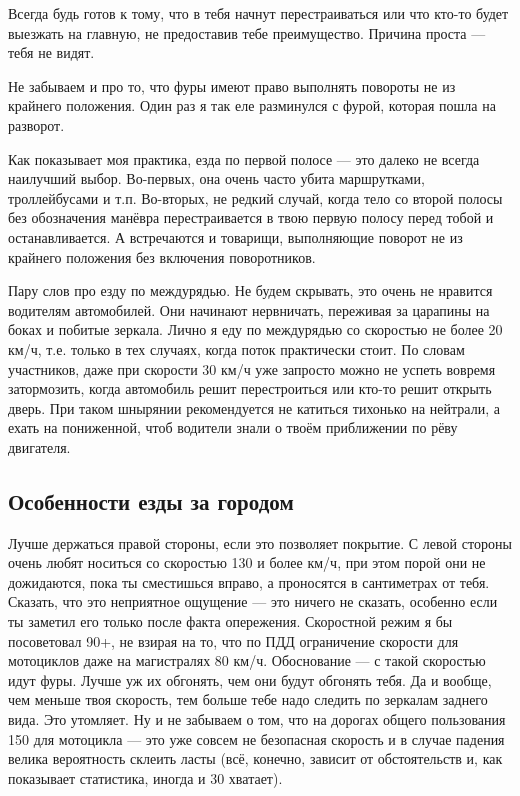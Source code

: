 \documentclass[12pt,a4paper]{article}
\begin{document}
Всегда будь готов к тому, что в тебя начнут перестраиваться или
что кто-то будет выезжать на главную, не предоставив тебе
преимущество. Причина проста --- тебя не видят.

Не забываем и про то, что фуры имеют право
выполнять повороты не из крайнего положения. Один раз я так еле
разминулся с фурой, которая пошла на разворот.

Как показывает моя практика, езда по первой полосе --- это далеко
не всегда наилучший выбор. Во-первых, она очень часто убита маршрутками,
троллейбусами и т.п. Во-вторых, не редкий случай, когда тело со второй
полосы без обозначения манёвра перестраивается в твою первую полосу
перед тобой и останавливается. А встречаются и товарищи, выполняющие
поворот не из крайнего положения без включения поворотников.

Пару слов про езду по междурядью. Не будем скрывать, это очень не
нравится водителям автомобилей. Они начинают нервничать, переживая
за царапины на боках и побитые зеркала. Лично я еду по междурядью со
скоростью не более 20 км/ч, т.е. только в тех случаях, когда поток
практически стоит. По словам участников, даже при скорости 30 км/ч
уже запросто можно не успеть вовремя затормозить, когда автомобиль
решит перестроиться или кто-то решит открыть дверь. При таком
шнырянии рекомендуется не катиться тихонько на нейтрали, а ехать
на пониженной, чтоб водители знали о твоём приближении по рёву
двигателя.

\subsection{Особенности езды за городом}

Лучше держаться правой стороны, если это позволяет покрытие.
С левой стороны очень любят носиться со скоростью 130 и более км/ч,
при этом порой они не дожидаются, пока ты сместишься вправо, а
проносятся в сантиметрах от тебя. Сказать, что это неприятное ощущение ---
это ничего не сказать, особенно если ты заметил его только после факта
опережения. Скоростной режим я бы посоветовал 90+, не взирая на то,
что по ПДД ограничение скорости для мотоциклов даже на магистралях
80 км/ч. Обоснование --- с такой скоростью идут фуры. Лучше уж их обгонять,
чем они будут обгонять тебя. Да и вообще, чем меньше твоя скорость,
тем больше тебе надо следить по зеркалам заднего вида. Это утомляет.
Ну и не забываем о том, что на дорогах общего пользования 150 для
мотоцикла --- это уже совсем не безопасная скорость и в случае
падения велика вероятность склеить ласты (всё, конечно, зависит от
обстоятельств и, как показывает статистика, иногда и 30 хватает).
\end{document}
